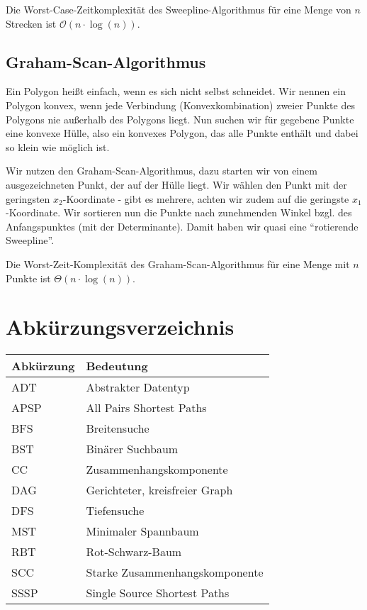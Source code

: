 \documentclass[12pt]{article}
\begin{document}
Die Worst-Case-Zeitkomplexität des Sweepline-Algorithmus für eine Menge von $n$ Strecken ist $\mathcal O(n \cdot \log(n))$.

\subsection{Graham-Scan-Algorithmus}

Ein Polygon heißt einfach, wenn es sich nicht selbst schneidet. Wir nennen ein Polygon konvex, wenn jede Verbindung (Konvexkombination) zweier Punkte des Polygons nie außerhalb des Polygons liegt. Nun suchen wir für gegebene Punkte eine konvexe Hülle, also ein konvexes Polygon, das alle Punkte enthält und dabei so klein wie möglich ist.

Wir nutzen den Graham-Scan-Algorithmus, dazu starten wir von einem ausgezeichneten Punkt, der auf der Hülle liegt. Wir wählen den Punkt mit der geringsten $x_2$-Koordinate - gibt es mehrere, achten wir zudem auf die geringste $x_1$-Koordinate. Wir sortieren nun die Punkte nach zunehmenden Winkel bzgl. des Anfangspunktes (mit der Determinante). Damit haben wir quasi eine \enquote{rotierende Sweepline}.

Die Worst-Zeit-Komplexität des Graham-Scan-Algorithmus für eine Menge mit $n$ Punkte ist $\Theta(n \cdot \log(n))$.

\section{Abkürzungsverzeichnis}

\begin{tabular}{l|l}
	Abkürzung & Bedeutung \\
	\toprule
	ADT & Abstrakter Datentyp	\\
	\midrule
	APSP & All Pairs Shortest Paths \\
	\midrule
	BFS & Breitensuche \\
	\midrule
	BST & Binärer Suchbaum \\
	\midrule
	CC & Zusammenhangskomponente \\
	\midrule
	DAG & Gerichteter, kreisfreier Graph \\
	\midrule
	DFS & Tiefensuche \\
	\midrule
	MST & Minimaler Spannbaum \\
	\midrule
	RBT & Rot-Schwarz-Baum \\
	\midrule
	SCC & Starke Zusammenhangskomponente \\
	\midrule
	SSSP & Single Source Shortest Paths \\
	\bottomrule
\end{tabular}
\end{document}
